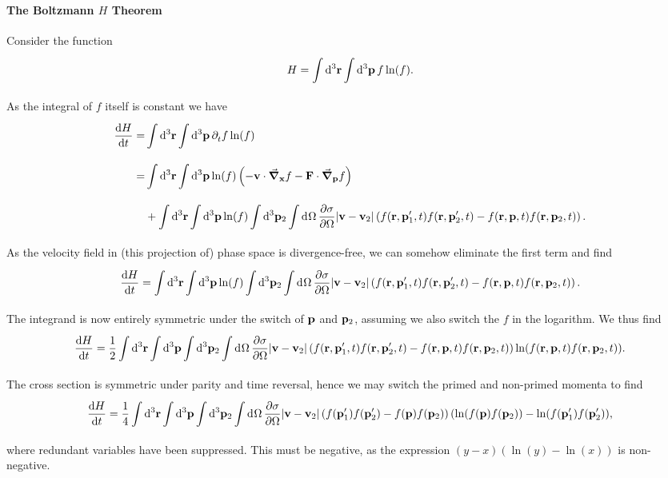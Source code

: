 \paragraph{The Boltzmann $H$ Theorem}
Consider the function
\begin{align*}
	H = \int\limits_{}^{}\dd[3]{\vb{r}}\int\limits_{}^{}\dd[3]{\vb{p}}f\ln(f).
\end{align*}
As the integral of $f$ itself is constant we have
\begin{align*}
	\dv{H}{t} =& \int\limits_{}^{}\dd[3]{\vb{r}}\int\limits_{}^{}\dd[3]{\vb{p}}\partial^{}_{t}{f}\ln(f) \\
	          =& \int\limits_{}^{}\dd[3]{\vb{r}}\int\limits_{}^{}\dd[3]{\vb{p}}\ln(f)\left(-\vb{v}\cdot\grad_{\vb{x}}{f} - \vb{F}\cdot\grad_{\vb{p}}{f}\right) \\
	           &+ \int\limits_{}^{}\dd[3]{\vb{r}}\int\limits_{}^{}\dd[3]{\vb{p}}\ln(f)\int\limits_{}^{}\dd[3]{\vb{p}_{2}}\int\limits_{}^{}\dd[]{\Omega}\pdv{\sigma}{\Omega}\abs{\vb{v} - \vb{v}_{2}}\left(f(\vb{r}, \vb{p}_{1}^{\prime}, t)f(\vb{r}, \vb{p}_{2}^{\prime}, t) - f(\vb{r}, \vb{p}, t)f(\vb{r}, \vb{p}_{2}, t)\right).
\end{align*}
As the velocity field in (this projection of) phase space is divergence-free, we can somehow eliminate the first term and find
\begin{align*}
	\dv{H}{t} = \int\limits_{}^{}\dd[3]{\vb{r}}\int\limits_{}^{}\dd[3]{\vb{p}}\ln(f)\int\limits_{}^{}\dd[3]{\vb{p}_{2}}\int\limits_{}^{}\dd[]{\Omega}\pdv{\sigma}{\Omega}\abs{\vb{v} - \vb{v}_{2}}\left(f(\vb{r}, \vb{p}_{1}^{\prime}, t)f(\vb{r}, \vb{p}_{2}^{\prime}, t) - f(\vb{r}, \vb{p}, t)f(\vb{r}, \vb{p}_{2}, t)\right).
\end{align*}
The integrand is now entirely symmetric under the switch of $\vb{p}$ and $\vb{p}_{2}$, assuming we also switch the $f$ in the logarithm. We thus find
\begin{align*}
	\dv{H}{t} = \frac{1}{2}\int\limits_{}^{}\dd[3]{\vb{r}}\int\limits_{}^{}\dd[3]{\vb{p}}\int\limits_{}^{}\dd[3]{\vb{p}_{2}}\int\limits_{}^{}\dd[]{\Omega}\pdv{\sigma}{\Omega}\abs{\vb{v} - \vb{v}_{2}}\left(f(\vb{r}, \vb{p}_{1}^{\prime}, t)f(\vb{r}, \vb{p}_{2}^{\prime}, t) - f(\vb{r}, \vb{p}, t)f(\vb{r}, \vb{p}_{2}, t)\right)\ln(f(\vb{r}, \vb{p}, t)f(\vb{r}, \vb{p}_{2}, t)).
\end{align*}
The cross section is symmetric under parity and time reversal, hence we may switch the primed and non-primed momenta to find
\begin{align*}
	\dv{H}{t} = \frac{1}{4}\int\limits_{}^{}\dd[3]{\vb{r}}\int\limits_{}^{}\dd[3]{\vb{p}}\int\limits_{}^{}\dd[3]{\vb{p}_{2}}\int\limits_{}^{}\dd[]{\Omega}\pdv{\sigma}{\Omega}\abs{\vb{v} - \vb{v}_{2}}\left(f(\vb{p}_{1}^{\prime})f(\vb{p}_{2}^{\prime}) - f(\vb{p})f(\vb{p}_{2})\right)(\ln(f(\vb{p})f(\vb{p}_{2})) - \ln(f(\vb{p}_{1}^{\prime})f(\vb{p}_{2}^{\prime})),
\end{align*}
where redundant variables have been suppressed. This must be negative, as the expression $(y - x)(\ln(y) -\ln(x))$ is non-negative.

